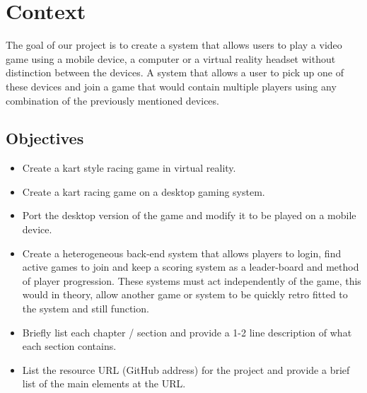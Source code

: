 
\chapter{Context}
The goal of our project is to create a system that allows users to play a video game using a mobile device, a computer or a virtual reality headset without distinction between the devices. A system that allows a user to pick up one of these devices and join a game that would contain multiple players using any combination of the previously mentioned devices.\newline

\section{Objectives}
\begin{itemize}
\item Create a kart style racing game in virtual reality.
\item Create a kart racing game on a desktop gaming system.
\item Port the desktop version of the game and modify it to be played on a mobile device.
\item Create a heterogeneous back-end system that allows players to login, find active games to join and keep a scoring system as a leader-board and method of player progression. These systems must act independently of the game, this would in theory, allow another game or system to be quickly retro fitted to the system and still function.
\item Briefly list each chapter / section and provide a 1-2 line description of what each section contains.
\item List the resource URL (GitHub address) for the project and provide a brief list of the main elements at the URL.
\end{itemize}